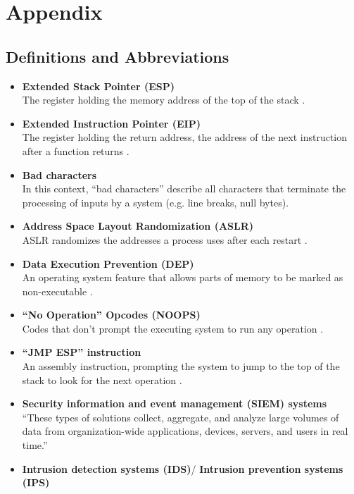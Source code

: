 \documentclass[../report.tex]{subfiles}
\begin{document}
\section{Appendix} \label{Appendix}
\vspace{-4mm}
\subsection{Definitions and Abbreviations}
\begin{itemize}
	\item{\textbf{Extended Stack Pointer (ESP)}}\\
	The register holding the memory address of the top of the stack \autocite{intel:dev_manual}.
	\item{\textbf{Extended Instruction Pointer (EIP)}}\\
	The register holding the return address, the address of the next instruction after a function returns \autocite{intel:dev_manual}.
	\item{\textbf{Bad characters}}\\
	In this context, \enquote{bad characters} describe all characters that terminate the processing of inputs by a system (e.g. line breaks, null bytes).
	\item{\textbf{Address Space Layout Randomization (ASLR)}}\\
	ASLR randomizes the addresses a process uses after each restart \autocite{app9142928}.
	\item{\textbf{Data Execution Prevention (DEP)}}\\
	An operating system feature that allows parts of memory to be marked as non-executable \autocite{microsoft:dep}.
	\item{\textbf{\enquote{No Operation} Opcodes (NOOPS)}}\\
	Codes that don't prompt the executing system to run any operation \autocite{arm_developer:nop}.
	\item{\textbf{\enquote{JMP ESP} instruction}}\\
	An assembly instruction, prompting the system to jump to the top of the stack to look for the next operation \autocite{arm_developer:jmp}.
	\item{\textbf{Security information and event management (SIEM) systems}}\\
	\enquote{These types of solutions collect, aggregate, and analyze large volumes of data from organization-wide applications, devices, servers, and users in real time.} \autocite{microsoft:siem}
	\item{\textbf{Intrusion detection systems (IDS)}/ \textbf{Intrusion prevention systems (IPS)}}\\

\end{itemize}
\end{document}
